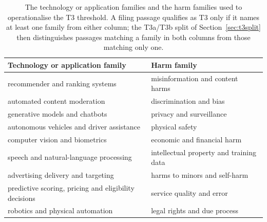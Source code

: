 \documentclass[utf8]{FrontiersinHarvard}
\begin{document}
\begin{table}[h!]
\caption{The technology or application families and the harm families used to operationalise the T3 threshold. A filing passage qualifies as T3 only if it names at least one family from either column; the T3a/T3b split of Section~\ref{sec:t3split} then distinguishes passages matching a family in both columns from those matching only one.}
\label{tab:families}
\small
\begin{center}
\begin{tabular}{@{}p{}p{}@{}}
\toprule
Technology or application family & Harm family \\ \midrule
recommender and ranking systems & misinformation and content harms \\
automated content moderation & discrimination and bias \\
generative models and chatbots & privacy and surveillance \\
autonomous vehicles and driver assistance & physical safety \\
computer vision and biometrics & economic and financial harm \\
speech and natural-language processing & intellectual property and training data \\
advertising delivery and targeting & harms to minors and self-harm \\
predictive scoring, pricing and eligibility decisions & service quality and error \\
robotics and physical automation & legal rights and due process \\
\bottomrule
\end{tabular}
\end{center}
\end{table}
\end{document}

